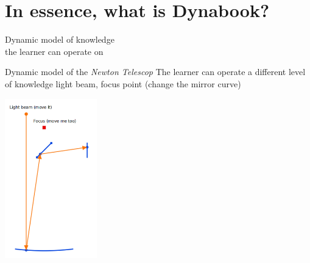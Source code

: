 \documentclass{beamer}
\begin{document}
\section{In essence, what is Dynabook?}
\begin{frame}
  \fontsize{14pt}{8pt}\selectfont
\begin{center}
  Dynamic model of knowledge\\ the learner can operate on
\end{center}
\end{frame}
%
\begin{frame}{Dynamic model of the \emph{Newton Telescop}}
 The learner
  can operate a different level of knowledge light beam, focus point
  (change the mirror curve)
\begin{center}
  \includegraphics[width=0.3\textwidth]{Newton.png}
\end{center}
\end{frame}
\end{document}
